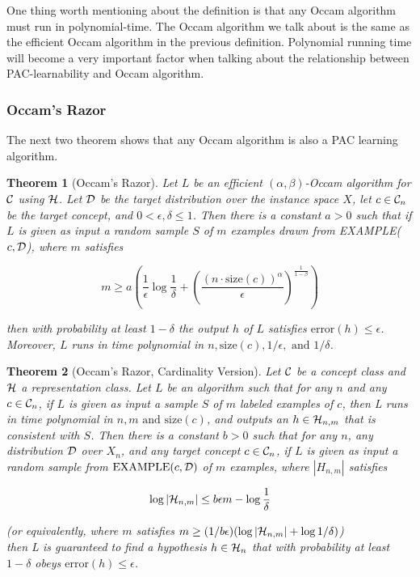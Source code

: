 \documentclass[12pt]{article}
\newtheorem{theorem}{Theorem}
\newcommand{\calc}{{\cal C}}
\newcommand{\cald}{{\cal D}}
\newcommand{\calh}{{\cal H}}
\begin{document}
One thing worth mentioning about the definition is that any Occam algorithm must run in polynomial-time. The Occam algorithm we talk about is the same as the efficient Occam algorithm in the previous definition. Polynomial running time will become a very important factor when talking about the relationship between PAC-learnability and Occam algorithm. \\

\subsubsection{Occam's Razor}

The next two theorem shows that any Occam algorithm is also a PAC learning algorithm.

\begin{theorem} [Occam's Razor] \label{theorem:occ}
Let $L$ be an efficient $(\alpha, \beta)$-Occam algorithm for $\calc$ using $\calh$. Let $\cald$ be the target distribution over the instance space $X$, let $c \in \calc_n$ be the target concept, and $0 < \epsilon, \delta \le 1$. Then there is a constant $a > 0$ such that if $L$ is given as input a random sample $S$ of $m$ examples drawn from EXAMPLE($c, \cald$), where $m$ satisfies

\begin{equation*}
m \ge a (\frac {1}{\epsilon} \log {\frac {1}{\delta}} + (\frac {(n \cdot \text {size}(c))^{\alpha}}{\epsilon})^{\frac {1}{1 - \beta}})
\end{equation*}

then with probability at least $1 - \delta$ the output $h$ of $L$ satisfies $\text {error}(h) \le \epsilon$. Moreover, $L$ runs in time polynomial in $n, \text {size}(c), 1/\epsilon, \text{ and } 1/\delta$.
\end{theorem}

\begin{theorem} [Occam's Razor, Cardinality Version] \label{theorem:occ-cad}
Let $\calc$ be a concept class and $\calh$ a representation class. Let $L$ be an algorithm such that for any $n$ and any $c \in \calc_n$, if $L$ is given as input a sample $S$ of $m$ labeled examples of $c$, then L runs in time polynomial in $n, m \text{ and size}(c)$, and outputs an $h \in \calh_{n,m}$ that is consistent with $S$. Then there is a constant $b > 0$ such that for any $n$, any distribution $\cald$ over $X_n$, and any target concept $c \in \calc_n$, if $L$ is given as input a random sample from $\text{EXAMPLE}(c, \cald)$ of $m$ examples, where $|H_{n,m}|$ satisfies

\begin{equation*}
\log {|\calh_{n,m}|} \le b \epsilon m - \log {\frac {1}{\delta}}
\end{equation*}

(or equivalently, where $m$ satisfies $m \ge (1 / {b \epsilon}) (\log {|\calh_{n,m}| + \log {1 / \delta}})$) \\
then L is guaranteed to find a hypothesis $h \in \calh_n$ that with probability at least $1 - \delta$ obeys $\text {error}(h) \le \epsilon$.
\end{theorem}
\end{document}
